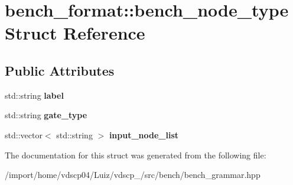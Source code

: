 \section{bench\+\_\+format\+:\+:bench\+\_\+node\+\_\+type Struct Reference}
\label{structbench__format_1_1bench__node__type}
\subsection*{Public Attributes}
\begin{DoxyCompactItemize}
\item 
std\+::string {\bfseries label}\label{structbench__format_1_1bench__node__type_ad84a489da088407c9eef963e35632b32}

\item 
std\+::string {\bfseries gate\+\_\+type}\label{structbench__format_1_1bench__node__type_aa6ff9b16997a95578623b93302abad12}

\item 
std\+::vector$<$ std\+::string $>$ {\bfseries input\+\_\+node\+\_\+list}\label{structbench__format_1_1bench__node__type_a006ef045067295870a13b146ebc10e52}

\end{DoxyCompactItemize}


The documentation for this struct was generated from the following file\+:\begin{DoxyCompactItemize}
\item 
/import/home/vdscp04/\+Luiz/vdscp\+\_/src/bench/bench\+\_\+grammar.\+hpp\end{DoxyCompactItemize}
